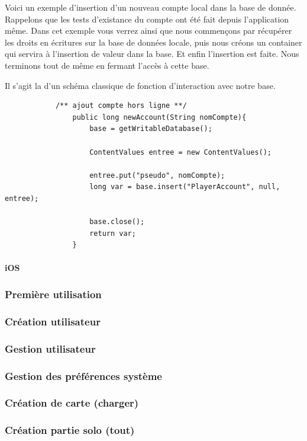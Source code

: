 			Voici un exemple d'insertion d'un nouveau compte local dans la base de
			donnée. Rappelons que les tests d'existance du compte ont été fait depuis
			l'application même. Dans cet exemple vous verrez ainsi que nous commençons
			par récupérer les droits en écritures sur la base de données locale, puis
			nous créons un container qui servira à l'insertion de valeur dans la base. Et
			enfin l'insertion est faite. Nous terminons tout de même en fermant l'accès à
			cette base.
			
			Il s'agit la d'un schéma classique de fonction d'interaction avec notre
			base.
						
			\begin{verbatim}
			/** ajout compte hors ligne **/
				public long newAccount(String nomCompte){
					base = getWritableDatabase();
			
					ContentValues entree = new ContentValues();
					
					entree.put("pseudo", nomCompte);
					long var = base.insert("PlayerAccount", null, entree);
					
					base.close();
					return var;
				}
			\end{verbatim}

			
		\paragraph{iOS}
				
	\subsubsection{Première utilisation}
	\subsubsection{Création utilisateur}
	\subsubsection{Gestion utilisateur}
	\subsubsection{Gestion des préférences système}
	\subsubsection{Création de carte (charger)}
	\subsubsection{Création partie solo (tout)}
